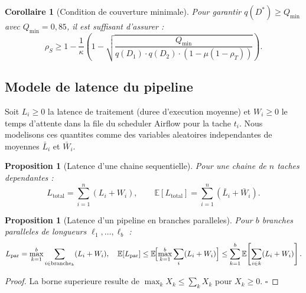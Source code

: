 \documentclass[12pt,a4paper]{article}
\theoremstyle{plain}
\newtheorem{proposition}[theorem]{Proposition}
\newtheorem{corollary}[theorem]{Corollaire}
\theoremstyle{definition}
\theoremstyle{remark}
\newcommand{\E}{\mathbb{E}}
\begin{document}
	\begin{corollary}[Condition de couverture minimale]
		\label{cor:coverage}
		Pour garantir $q(D^*) \geq Q_{\min}$ avec $Q_{\min}=0{,}85$, il est
		suffisant d'assurer :
		\begin{equation}
			\rho_S \geq 1 - \frac{1}{\kappa}\left(1 -
			\sqrt{\frac{Q_{\min}}{q(D_1)\cdot q(D_2)\cdot (1-\mu(1-\rho_T))}}\right).
			\label{eq:coverage_cond}
		\end{equation}
	\end{corollary}
	
	\subsection{Modele de latence du pipeline}
	\label{subsec:latency}
	
	Soit $L_i \geq 0$ la latence de traitement (duree d'execution moyenne)
	et $W_i \geq 0$ le temps d'attente dans la file du scheduler Airflow
	pour la tache $t_i$. Nous modelisons ces quantites comme des variables
	aleatoires independantes de moyennes $\bar L_i$ et $\bar W_i$.
	
	\begin{proposition}[Latence d'une chaine sequentielle]
		\label{prop:latency_chain}
		Pour une chaine de $n$ taches dependantes :
		\begin{equation}
			L_{\text{total}} = \sum_{i=1}^n (L_i + W_i),
			\qquad
			\E[L_{\text{total}}] = \sum_{i=1}^n (\bar L_i + \bar W_i).
			\label{eq:latency}
		\end{equation}
	\end{proposition}
	
	\begin{proposition}[Latence d'un pipeline en branches paralleles]
		\label{prop:latency_parallel}
		Pour $b$ branches paralleles de longueurs $\ell_1,\ldots,\ell_b$ :
		\begin{equation}
			L_{\text{par}} = \max_{k=1}^b \sum_{i \in \text{branche}_k} (L_i + W_i),
			\quad
			\E[L_{\text{par}}]
			\leq \E\!\Bigl[\max_{k=1}^b \sum_{i} (L_i+W_i)\Bigr]
			\leq \sum_{k=1}^b \E\!\left[\sum_{i\in k}(L_i+W_i)\right].
			\label{eq:latency_par}
		\end{equation}
	\end{proposition}
	
	\begin{proof}
		La borne superieure resulte de $\max_k X_k \leq \sum_k X_k$
		pour $X_k \geq 0$. \hfill$\square$
	\end{proof}
	
\end{document}
